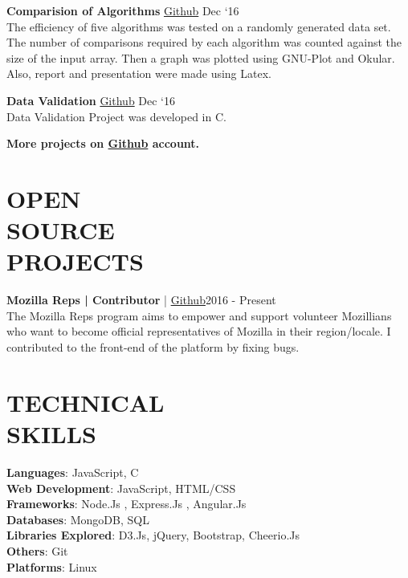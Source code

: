 \documentclass[margin]{res}
\begin{document}
\begin{resume}
  {\textbf{Comparision of Algorithms}} \href{https://github.com/karanagarwal17/comparision-of-algorithms}{Github} \hfill Dec `16\\
  The efficiency of five algorithms was tested on a randomly generated data set. The number of comparisons required by each algorithm was counted against the size of the input array. Then a graph was plotted using GNU-Plot and Okular. Also, report and presentation were made using Latex.

  {\textbf{Data Validation}} \href{https://github.com/karanagarwal17/Data-Validation}{Github} \hfill Dec `16\\
  Data Validation Project was developed in C.

  \textbf{More projects on \href{https://github.com/karanagarwal17}{Github} account.}

  \section{OPEN \\SOURCE \\ PROJECTS}

      \textbf{Mozilla Reps |  Contributor}  | \href{https://github.com/mozilla/remo/pulls/karanagarwal17}{ Github}\hfill 2016 - Present \\
      The Mozilla Reps program aims to empower and support volunteer Mozillians who want to become official representatives of Mozilla in their region/locale. I contributed to the front-end of the platform by fixing bugs.

\section{TECHNICAL \\ SKILLS}
  {\textbf{Languages}:} JavaScript, C\\
	{\textbf{Web Development}:} JavaScript, HTML/CSS\\
  {\textbf{Frameworks}:} Node.Js , Express.Js , Angular.Js\\
  {\textbf{Databases}:} MongoDB, SQL\\
  {\textbf{Libraries Explored}:} D3.Js, jQuery, Bootstrap, Cheerio.Js\\
  {\textbf{Others}:} Git\\
  {\textbf{Platforms}:} Linux


\end{resume}
\end{document}
